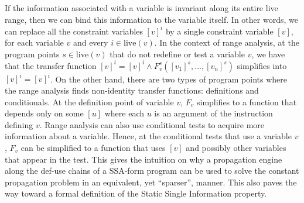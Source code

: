 If the information associated with a variable is invariant along its
entire live range, then we can bind this information to the variable itself.
In other words, we can replace all the constraint variables
$[v]^i$ by a single constraint variable $[v]$, for each variable $v$
and every $i\in \textrm{live}(v)$.
In the context of range analysis, at the program points $s\in \textrm{live}(v)$ that do not redefine or test a variable $v$, we have that the transfer function $[v]^i = [v]^i \wedge F_v^s([v_1]^s, \dots, [v_n]^s)$ simplifies into $[v]^i = [v]^i$.
On the other hand, there are two types of program points where the range analysis finds non-identity transfer functions: definitions and conditionals.
At the definition point of variable $v$, $F_v$ simplifies to a function that depends only on some $[u]$ where each $u$ is an argument of the instruction defining $v$.
Range analysis can also use conditional tests to acquire more information about a variable.
Hence, at the conditional tests that use a variable $v$, $F_v$ can be simplified to a function that uses $[v]$ and possibly other variables that appear in the test.
This gives the intuition on why a propagation engine along the def-use chains of a SSA-form program can be used to solve the constant propagation problem in an equivalent, yet ``sparser'', manner.
This also paves the way toward a formal definition of the Static Single Information property.

